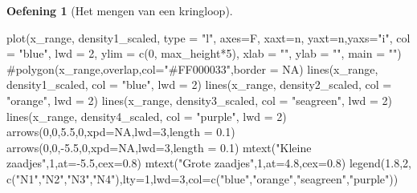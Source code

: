 \documentclass[
  a4paper,
]{scrbook}
\newenvironment{Shaded}{\begin{snugshade}}{\end{snugshade}}
\newcommand{\AttributeTok}[1]{\textcolor[rgb]{0.40,0.45,0.13}{#1}}
\newcommand{\CommentTok}[1]{\textcolor[rgb]{0.37,0.37,0.37}{#1}}
\newcommand{\ConstantTok}[1]{\textcolor[rgb]{0.56,0.35,0.01}{#1}}
\newcommand{\DecValTok}[1]{\textcolor[rgb]{0.68,0.00,0.00}{#1}}
\newcommand{\FloatTok}[1]{\textcolor[rgb]{0.68,0.00,0.00}{#1}}
\newcommand{\FunctionTok}[1]{\textcolor[rgb]{0.28,0.35,0.67}{#1}}
\newcommand{\NormalTok}[1]{\textcolor[rgb]{0.00,0.23,0.31}{#1}}
\newcommand{\SpecialCharTok}[1]{\textcolor[rgb]{0.37,0.37,0.37}{#1}}
\newcommand{\StringTok}[1]{\textcolor[rgb]{0.13,0.47,0.30}{#1}}
\theoremstyle{definition}
\newtheorem{exercise}{Oefening}[chapter]
\theoremstyle{remark}
\begin{document}
\begin{exercise}[Het mengen van een
kringloop]
\begin{Shaded}
\begin{Highlighting}[]
  \FunctionTok{plot}\NormalTok{(x\_range, density1\_scaled, }\AttributeTok{type =} \StringTok{"l"}\NormalTok{, }
       \AttributeTok{axes=}\NormalTok{F, }\AttributeTok{xaxt=}\StringTok{\textquotesingle{}n\textquotesingle{}}\NormalTok{, }\AttributeTok{yaxt=}\StringTok{\textquotesingle{}n\textquotesingle{}}\NormalTok{,}\AttributeTok{yaxs=}\StringTok{"i"}\NormalTok{,}
       \AttributeTok{col =} \StringTok{"blue"}\NormalTok{, }\AttributeTok{lwd =} \DecValTok{2}\NormalTok{, }\AttributeTok{ylim =} \FunctionTok{c}\NormalTok{(}\DecValTok{0}\NormalTok{, max\_height}\SpecialCharTok{*}\DecValTok{5}\NormalTok{), }
       \AttributeTok{xlab =} \StringTok{""}\NormalTok{, }\AttributeTok{ylab =} \StringTok{""}\NormalTok{, }\AttributeTok{main =} \StringTok{""}\NormalTok{)}
  \CommentTok{\#polygon(x\_range,overlap,col="\#FF000033",border = NA)}
  \FunctionTok{lines}\NormalTok{(x\_range, density1\_scaled, }\AttributeTok{col =} \StringTok{"blue"}\NormalTok{, }\AttributeTok{lwd =} \DecValTok{2}\NormalTok{)}
  \FunctionTok{lines}\NormalTok{(x\_range, density2\_scaled, }\AttributeTok{col =} \StringTok{"orange"}\NormalTok{, }\AttributeTok{lwd =} \DecValTok{2}\NormalTok{)}
  \FunctionTok{lines}\NormalTok{(x\_range, density3\_scaled, }\AttributeTok{col =} \StringTok{"seagreen"}\NormalTok{, }\AttributeTok{lwd =} \DecValTok{2}\NormalTok{)}
  \FunctionTok{lines}\NormalTok{(x\_range, density4\_scaled, }\AttributeTok{col =} \StringTok{"purple"}\NormalTok{, }\AttributeTok{lwd =} \DecValTok{2}\NormalTok{)}
  \FunctionTok{arrows}\NormalTok{(}\DecValTok{0}\NormalTok{,}\DecValTok{0}\NormalTok{,}\FloatTok{5.5}\NormalTok{,}\DecValTok{0}\NormalTok{,}\AttributeTok{xpd=}\ConstantTok{NA}\NormalTok{,}\AttributeTok{lwd=}\DecValTok{3}\NormalTok{,}\AttributeTok{length =} \FloatTok{0.1}\NormalTok{)}
  \FunctionTok{arrows}\NormalTok{(}\DecValTok{0}\NormalTok{,}\DecValTok{0}\NormalTok{,}\SpecialCharTok{{-}}\FloatTok{5.5}\NormalTok{,}\DecValTok{0}\NormalTok{,}\AttributeTok{xpd=}\ConstantTok{NA}\NormalTok{,}\AttributeTok{lwd=}\DecValTok{3}\NormalTok{,}\AttributeTok{length =} \FloatTok{0.1}\NormalTok{)}
  \FunctionTok{mtext}\NormalTok{(}\StringTok{"Kleine zaadjes"}\NormalTok{,}\DecValTok{1}\NormalTok{,}\AttributeTok{at=}\SpecialCharTok{{-}}\FloatTok{5.5}\NormalTok{,}\AttributeTok{cex=}\FloatTok{0.8}\NormalTok{)}
  \FunctionTok{mtext}\NormalTok{(}\StringTok{"Grote zaadjes"}\NormalTok{,}\DecValTok{1}\NormalTok{,}\AttributeTok{at=}\FloatTok{4.8}\NormalTok{,}\AttributeTok{cex=}\FloatTok{0.8}\NormalTok{)}
  \FunctionTok{legend}\NormalTok{(}\FloatTok{1.8}\NormalTok{,}\DecValTok{2}\NormalTok{, }\FunctionTok{c}\NormalTok{(}\StringTok{"N1"}\NormalTok{,}\StringTok{"N2"}\NormalTok{,}\StringTok{"N3"}\NormalTok{,}\StringTok{"N4"}\NormalTok{),}\AttributeTok{lty=}\DecValTok{1}\NormalTok{,}\AttributeTok{lwd=}\DecValTok{3}\NormalTok{,}\AttributeTok{col=}\FunctionTok{c}\NormalTok{(}\StringTok{"blue"}\NormalTok{,}\StringTok{"orange"}\NormalTok{,}\StringTok{"seagreen"}\NormalTok{,}\StringTok{"purple"}\NormalTok{))}
  

\end{Highlighting}
\end{Shaded}
\end{exercise}
\end{document}

